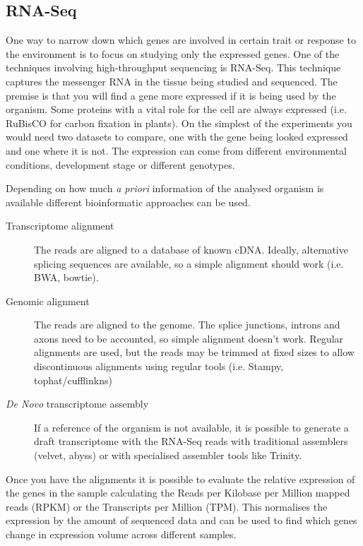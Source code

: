 \subsection{RNA-Seq}
\label{lit:RNASeq}

One way to narrow down which genes are involved in certain trait or response to the environment is to focus on studying only the expressed genes. One of the techniques involving high-throughput sequencing is RNA-Seq. This technique captures the messenger RNA in the tissue being studied and sequenced. The premise is that you will find a gene more expressed if it is being used by the organism. Some proteins with a vital role for the cell are always expressed (i.e. RuBisCO for carbon fixation in plants\cite{CooperGM2000}). On the simplest of the experiments you would need two datasets to compare, one with the gene being looked expressed and one where it is not. The expression can come from different environmental conditions, development stage or different genotypes.\cite{Mortazavi2008} 

Depending on how much \textit{a priori} information of the analysed organism is available different bioinformatic approaches can be used.
\begin{description}
\item[Transcriptome alignment] The reads are aligned to a database of known cDNA. Ideally, alternative splicing sequences are available, so a simple alignment should work (i.e. BWA, bowtie). 
\item[Genomic alignment] The reads are aligned to the genome. The splice junctions, introns and axons need to be accounted, so simple alignment doesn't work. Regular alignments are used, but the reads may be trimmed at fixed sizes to allow discontinuous alignments using regular tools (i.e. Stampy, tophat/cufflinkns)
\item[\textit{De Novo} transcriptome assembly] If a reference of the organism is not available, it is possible to generate a draft transcriptome with the RNA-Seq reads with traditional assemblers (velvet, abyss) or with specialised assembler tools like Trinity. 
\end{description}

Once you have the alignments it is possible to evaluate the relative expression of the genes in the sample calculating the Reads per Kilobase per Million mapped reads (RPKM) or the Transcripts per Million (TPM). This normalises the expression by the amount of sequenced data and can be used to find which genes change in expression volume across different samples.   


